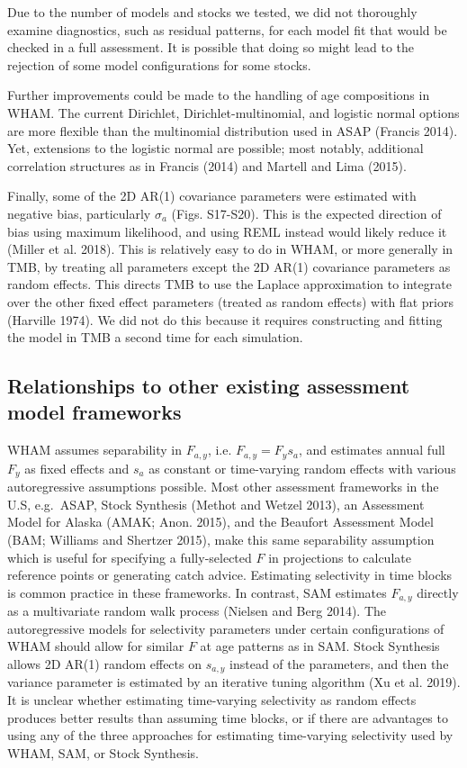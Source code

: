 \documentclass[]{article}
\begin{document}
Due to the number of models and stocks we tested, we did not thoroughly
examine diagnostics, such as residual patterns, for each model fit that
would be checked in a full assessment. It is possible that doing so
might lead to the rejection of some model configurations for some
stocks.

Further improvements could be made to the handling of age compositions
in WHAM. The current Dirichlet, Dirichlet-multinomial, and logistic
normal options are more flexible than the multinomial distribution used
in ASAP (Francis 2014). Yet, extensions to the logistic normal are
possible; most notably, additional correlation structures as in Francis
(2014) and Martell and Lima (2015).

Finally, some of the 2D AR(1) covariance parameters were estimated with
negative bias, particularly \(\sigma_a\) (Figs. S17-S20). This is the
expected direction of bias using maximum likelihood, and using REML
instead would likely reduce it (Miller et al. 2018). This is relatively
easy to do in WHAM, or more generally in TMB, by treating all parameters
except the 2D AR(1) covariance parameters as random effects. This
directs TMB to use the Laplace approximation to integrate over the other
fixed effect parameters (treated as random effects) with flat priors
(Harville 1974). We did not do this because it requires constructing and
fitting the model in TMB a second time for each simulation.

\hypertarget{relationships-to-other-existing-assessment-model-frameworks}{%
\subsection{Relationships to other existing assessment model
frameworks}\label{relationships-to-other-existing-assessment-model-frameworks}}

WHAM assumes separability in \(F_{a,y}\), i.e. \(F_{a,y} = F_y s_a\),
and estimates annual full \(F_y\) as fixed effects and \(s_a\) as
constant or time-varying random effects with various autoregressive
assumptions possible. Most other assessment frameworks in the U.S,
e.g.~ASAP, Stock Synthesis (Methot and Wetzel 2013), an Assessment Model
for Alaska (AMAK; Anon. 2015), and the Beaufort Assessment Model (BAM;
Williams and Shertzer 2015), make this same separability assumption
which is useful for specifying a fully-selected \(F\) in projections to
calculate reference points or generating catch advice. Estimating
selectivity in time blocks is common practice in these frameworks. In
contrast, SAM estimates \(F_{a,y}\) directly as a multivariate random
walk process (Nielsen and Berg 2014). The autoregressive models for
selectivity parameters under certain configurations of WHAM should allow
for similar \(F\) at age patterns as in SAM. Stock Synthesis allows 2D
AR(1) random effects on \(s_{a,y}\) instead of the parameters, and then
the variance parameter is estimated by an iterative tuning algorithm (Xu
et al. 2019). It is unclear whether estimating time-varying selectivity
as random effects produces better results than assuming time blocks, or
if there are advantages to using any of the three approaches for
estimating time-varying selectivity used by WHAM, SAM, or Stock
Synthesis.
\end{document}
